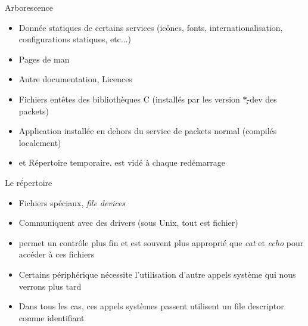 \begin{frame}[fragile=singleslide]{Arborescence}
  \begin{itemize}
  \item  {}  Donnée   statiques  de  certains  services
    (icônes,  fonts,  internationalisation, configurations  statiques,
    etc...)
  \item {} Pages de man
  \item {} Autre documentation, Licences
  \item  {}  Fichiers  entêtes  des  bibliothèques  C
    (installés par les version \c{*-dev} des packets)
  \item {}   Application installée en dehors
    du service de packets normal (compilés localement)
  \item      {}       et            Répertoire
    temporaire.  est vidé à chaque redémarrage
  \end{itemize}
\end{frame}

\begin{frame}[fragile=singleslide]{Le répertoire }
  \begin{itemize}
  \item Fichiers spéciaux, \emph{file devices}
  \item Communiquent avec des drivers (sous Unix, tout est fichier)
  \item {}  permet un contrôle  plus fin et est  souvent plus
    approprié  que  \emph{cat}  et  \emph{echo}  pour  accéder  à  ces
    fichiers
  \item Certains  périphérique nécessite l'utilisation  d'autre appels
    système qui nous verrons plus tard
  \item Dans  tous les cas,  ces appels systèmes passent  utilisent un
    file descriptor comme identifiant
  \end{itemize}
\end{frame}

